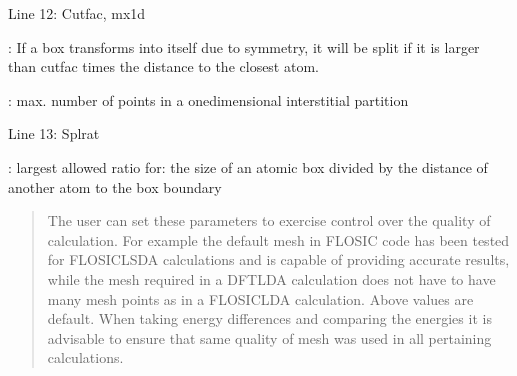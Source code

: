 \documentclass[letterpaper,10pt,english,openany,oneside]{sphinxmanual}
\begin{document}
\sphinxAtStartPar
Line 12: Cutfac, mx1d

\sphinxAtStartPar
{}: If a box transforms into itself due to symmetry, it will be split if it is larger than cutfac times the distance to the closest atom.

\sphinxAtStartPar
{}: max. number of points in a one\sphinxhyphen{}dimensional interstitial partition

\sphinxAtStartPar
Line 13: Splrat

\sphinxAtStartPar
{}: largest allowed ratio for: the size of an atomic box divided by the distance of another atom to the box boundary
\begin{quote}

\sphinxAtStartPar
The user can set these parameters to exercise control over the quality of calculation. For example the default mesh in FLOSIC code has been tested for FLO\sphinxhyphen{}SIC\sphinxhyphen{}LSDA calculations and is capable of providing accurate results, while the mesh required in a DFT\sphinxhyphen{}LDA calculation does not have to have many mesh points as in a FLO\sphinxhyphen{}SIC\sphinxhyphen{}LDA calculation. Above values are default.  When taking energy differences and comparing the energies it is advisable to ensure that same quality of mesh was used in all pertaining calculations.
\end{quote}
\end{document}
